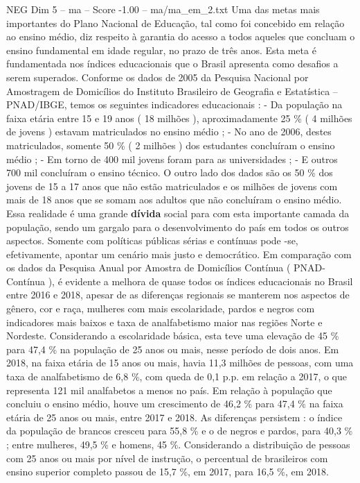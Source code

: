 \begin{textsample}{NEG Dim 5 – ma – Score -1.00 – ma/ma\_em\_2.txt}
Uma das metas mais importantes do Plano Nacional de Educação, tal como foi concebido em relação ao ensino médio, diz respeito à garantia do acesso a todos aqueles que concluam o ensino fundamental em idade regular, no prazo de três anos.
Esta meta é fundamentada nos índices educacionais que o Brasil apresenta como desafios a serem superados.
Conforme os dados de 2005 da Pesquisa Nacional por Amostragem de Domicílios do Instituto Brasileiro de Geografia e Estatística – PNAD/IBGE, temos os seguintes indicadores educacionais : - Da população na faixa etária entre 15 e 19 anos ( 18 milhões ), aproximadamente 25 \% ( 4 milhões de jovens ) estavam matriculados no ensino médio ; - No ano de 2006, destes matriculados, somente 50 \% ( 2 milhões ) dos estudantes concluíram o ensino médio ; - Em torno de 400 mil jovens foram para as universidades ; - E outros 700 mil concluíram o ensino técnico.
O outro lado dos dados são os 50 \% dos jovens de 15 a 17 anos que não estão matriculados e os milhões de jovens com mais de 18 anos que se somam aos adultos que não concluíram o ensino médio.
Essa realidade é uma grande \textbf{dívida} social para com esta importante camada da população, sendo um gargalo para o desenvolvimento do país em todos os outros aspectos.
Somente com políticas públicas sérias e contínuas pode -se, efetivamente, apontar um cenário mais justo e democrático.
Em comparação com os dados da Pesquisa Anual por Amostra de Domicílios Contínua ( PNAD-Contínua ), é evidente a melhora de quase todos os índices educacionais no Brasil entre 2016 e 2018, apesar de as diferenças regionais se manterem nos aspectos de gênero, cor e raça, mulheres com mais escolaridade, pardos e negros com indicadores mais baixos e taxa de analfabetismo maior nas regiões Norte e Nordeste.
Considerando a escolaridade básica, esta teve uma elevação de 45 \% para 47,4 \% na população de 25 anos ou mais, nesse período de dois anos.
Em 2018, na faixa etária de 15 anos ou mais, havia 11,3 milhões de pessoas, com uma taxa de analfabetismo de 6,8 \%, com queda de 0,1 p.p. em relação a 2017, o que representa 121 mil analfabetos a menos no país.
Em relação à população que concluiu o ensino médio, houve um crescimento de 46,2 \% para 47,4 \% na faixa etária de 25 anos ou mais, entre 2017 e 2018.
As diferenças persistem : o índice da população de brancos cresceu para 55,8 \% e o de negros e pardos, para 40,3 \% ; entre mulheres, 49,5 \% e homens, 45 \%.
Considerando a distribuição de pessoas com 25 anos ou mais por nível de instrução, o percentual de brasileiros com ensino superior completo passou de 15,7 \%, em 2017, para 16,5 \%, em 2018.

\end{textsample}
